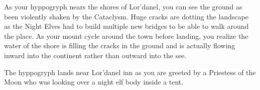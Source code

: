 
As your hyppogryph nears the shores of Lor'danel, you can see the ground as been violently shaken by the Cataclysm. Huge cracks are dotting the landscape as the Night Elves had to build multiple new bridges to be able to walk around the place. As your mount cycle around the town before landing, you realize the water of the shore is filling the cracks in the ground and is actually flowing inward into the continent rather than outward into the see.

The hyppogryph lands near Lor'danel inn as you are greeted by a Priestess of the Moon who was looking over a night elf body inside a tent.


